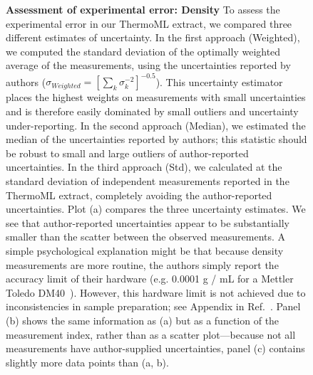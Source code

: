 \documentclass[aps,pre,twocolumn,nofootinbib,superscriptaddress,linenumbers]{revtex4-1}
\begin{document}
\begin{figure}
\caption{{\bf Assessment of experimental error: Density}
To assess the experimental error in our ThermoML extract, we compared three different estimates of uncertainty.  
In the first approach (Weighted), we computed the standard deviation of the optimally weighted average of the measurements, using the uncertainties reported by authors ($\sigma_{Weighted} = [\sum_k \sigma_k^{-2}]^{-0.5}$).
This uncertainty estimator places the highest weights on measurements with small uncertainties and is therefore easily dominated by small outliers and uncertainty under-reporting.
In the second approach (Median), we estimated the median of the uncertainties reported by authors; this statistic should be robust to small and large outliers of author-reported uncertainties.
In the third approach (Std), we calculated at the standard deviation of independent measurements reported in the ThermoML extract, completely avoiding the author-reported uncertainties.
Plot (a) compares the three uncertainty estimates.
We see that author-reported uncertainties appear to be substantially smaller than the scatter between the observed measurements.
A simple psychological explanation might be that because density measurements are more routine, the authors simply report the accuracy limit of their hardware (e.g. 0.0001 g / mL for a Mettler Toledo DM40~\cite{mettlertoledo}).  
However, this hardware limit is not achieved due to inconsistencies in sample preparation; see Appendix in Ref.~\cite{chirico2013improvement}.  
Panel (b) shows the same information as (a) but as a function of the measurement index, rather than as a scatter plot---because not all measurements have author-supplied uncertainties, panel (c) contains slightly more data points than (a, b).  
}
\label{figure:ErrorAnalysisDensity}

\end{figure}



\clearpage
\end{document}
